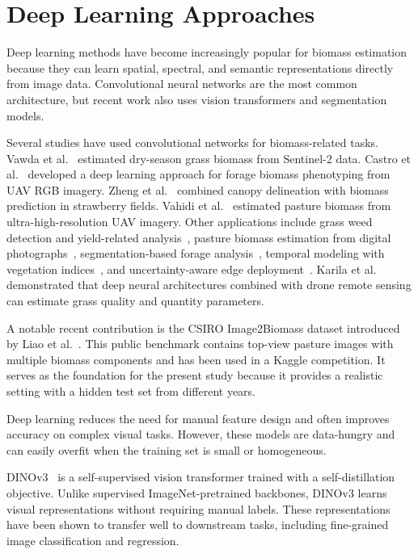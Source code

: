 \section{Deep Learning Approaches}

Deep learning methods have become increasingly popular for biomass estimation because they can learn spatial, spectral, and semantic representations directly from image data. Convolutional neural networks are the most common architecture, but recent work also uses vision transformers and segmentation models.

Several studies have used convolutional networks for biomass-related tasks. Vawda et al.~\cite{vawda2024cnn} estimated dry-season grass biomass from Sentinel-2 data. Castro et al.~\cite{castro2020deep} developed a deep learning approach for forage biomass phenotyping from UAV RGB imagery. Zheng et al.~\cite{zheng2022strawberry} combined canopy delineation with biomass prediction in strawberry fields. Vahidi et al.~\cite{vahidi2023rgbuav} estimated pasture biomass from ultra-high-resolution UAV imagery. Other applications include grass weed detection and yield-related analysis~\cite{liu2024weed}, pasture biomass estimation from digital photographs~\cite{woodrow2023continuous}, segmentation-based forage analysis~\cite{moreno2025segmentation}, temporal modeling with vegetation indices~\cite{wagle2024timeseries}, and uncertainty-aware edge deployment~\cite{zawish2024edge}. Karila et al.~\cite{karila2022grass} demonstrated that deep neural architectures combined with drone remote sensing can estimate grass quality and quantity parameters.

A notable recent contribution is the CSIRO Image2Biomass dataset introduced by Liao et al.~\cite{liao2025estimating}. This public benchmark contains top-view pasture images with multiple biomass components and has been used in a Kaggle competition. It serves as the foundation for the present study because it provides a realistic setting with a hidden test set from different years.

Deep learning reduces the need for manual feature design and often improves accuracy on complex visual tasks. However, these models are data-hungry and can easily overfit when the training set is small or homogeneous.

DINOv3~\cite{simeoni2025dinov3} is a self-supervised vision transformer trained with a self-distillation objective. Unlike supervised ImageNet-pretrained backbones, DINOv3 learns visual representations without requiring manual labels. These representations have been shown to transfer well to downstream tasks, including fine-grained image classification and regression.

